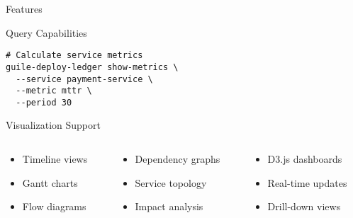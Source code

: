 \documentclass[presentation,aspectratio=169]{beamer}
\begin{document}
\begin{frame}[label={sec:orgb2085a8},fragile]{Features}
\begin{block}{Query Capabilities}
\begin{verbatim}
# Calculate service metrics
guile-deploy-ledger show-metrics \
  --service payment-service \
  --metric mttr \
  --period 30
\end{verbatim}
\end{block}
\begin{block}{Visualization Support}
\begin{columns}
\begin{column}{0.33\columnwidth}
\begin{itemize}
\item Timeline views
\item Gantt charts
\item Flow diagrams
\end{itemize}
\end{column}
\begin{column}{0.33\columnwidth}
\begin{itemize}
\item Dependency graphs
\item Service topology
\item Impact analysis
\end{itemize}
\end{column}
\begin{column}{0.33\columnwidth}
\begin{itemize}
\item D3.js dashboards
\item Real-time updates
\item Drill-down views
\end{itemize}
\end{column}
\end{columns}
\end{block}
\end{frame}
\end{document}
